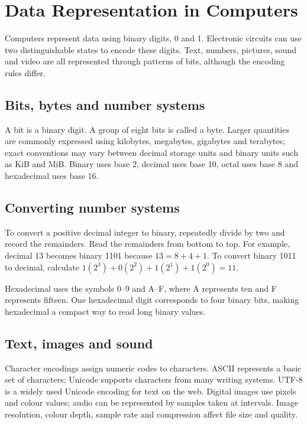 \documentclass[11pt,openany,oneside]{book}
\begin{document}
\chapter{Data Representation in Computers}
Computers represent data using binary digits, 0 and 1. Electronic circuits can use two distinguishable states to encode these digits. Text, numbers, pictures, sound and video are all represented through patterns of bits, although the encoding rules differ.

\section{Bits, bytes and number systems}
A bit is a binary digit. A group of eight bits is called a byte. Larger quantities are commonly expressed using kilobytes, megabytes, gigabytes and terabytes; exact conventions may vary between decimal storage units and binary units such as KiB and MiB. Binary uses base 2, decimal uses base 10, octal uses base 8 and hexadecimal uses base 16.

\begin{center}
\end{center}

\section{Converting number systems}
To convert a positive decimal integer to binary, repeatedly divide by two and record the remainders. Read the remainders from bottom to top. For example, decimal 13 becomes binary 1101 because \(13=8+4+1\). To convert binary 1011 to decimal, calculate \(1(2^3)+0(2^2)+1(2^1)+1(2^0)=11\).

Hexadecimal uses the symbols 0–9 and A–F, where A represents ten and F represents fifteen. One hexadecimal digit corresponds to four binary bits, making hexadecimal a compact way to read long binary values.

\section{Text, images and sound}
Character encodings assign numeric codes to characters. ASCII represents a basic set of characters; Unicode supports characters from many writing systems. UTF-8 is a widely used Unicode encoding for text on the web. Digital images use pixels and colour values; audio can be represented by samples taken at intervals. Image resolution, colour depth, sample rate and compression affect file size and quality.
\end{document}
